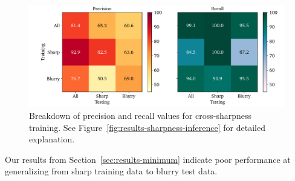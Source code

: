 \begin{figure}[htbp]
  \centering
  \includegraphics[width=\textwidth]{figs/results/sharpness/confustion_balanced_test_dual.pdf}
  \caption[Precision \& Recall across sharpness boundary]{%
Breakdown of precision and recall values for cross-sharpness training. See Figure~\ref{fig:results-sharpness-inference} for detailed explanation.
  }\label{fig:results-sharpness-pr-rec}
\end{figure}

Our results from Section~\ref{sec:results-minimum} indicate poor performance at generalizing from sharp training data to blurry test data.